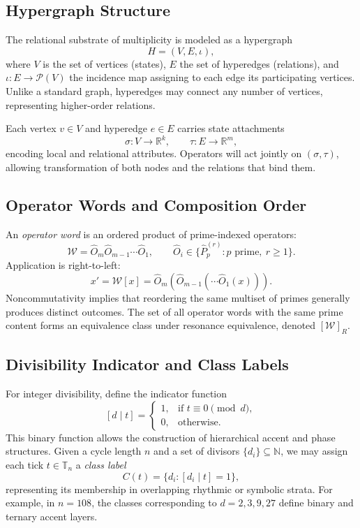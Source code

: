 \documentclass[12pt]{article}
\numberwithin{equation}{section}
\theoremstyle{plain}
\theoremstyle{definition}
\theoremstyle{remark}
\begin{document}
\subsection*{Hypergraph Structure}
The relational substrate of multiplicity is modeled as a hypergraph
\[
H = (V, E, \iota),
\]
where \(V\) is the set of vertices (states), \(E\) the set of hyperedges (relations), and \(\iota:E\to \mathcal{P}(V)\) the incidence map assigning to each edge its participating vertices. Unlike a standard graph, hyperedges may connect any number of vertices, representing higher-order relations.

Each vertex \(v\in V\) and hyperedge \(e\in E\) carries state attachments
\[
\sigma: V \to \mathbb{R}^k, \qquad \tau: E \to \mathbb{R}^m,
\]
encoding local and relational attributes. Operators will act jointly on \((\sigma,\tau)\), allowing transformation of both nodes and the relations that bind them.

\subsection*{Operator Words and Composition Order}
An \emph{operator word} is an ordered product of prime-indexed operators:
\[
\mathcal{W} = \hat{O}_m \hat{O}_{m-1}\cdots \hat{O}_1, \qquad \hat{O}_i \in \{\hat{P}_p^{(r)} : p \text{ prime},\ r\ge 1\}.
\]
Application is right-to-left:
\[
x' = \mathcal{W}[x] = \hat{O}_m(\hat{O}_{m-1}(\cdots \hat{O}_1(x))).
\]
Noncommutativity implies that reordering the same multiset of primes generally produces distinct outcomes. The set of all operator words with the same prime content forms an equivalence class under resonance equivalence, denoted \([\mathcal{W}]_R\).

\subsection*{Divisibility Indicator and Class Labels}
For integer divisibility, define the indicator function
\[
[d\mid t] = 
\begin{cases}
1, & \text{if } t \equiv 0 \pmod d,\\
0, & \text{otherwise}.
\end{cases}
\]
This binary function allows the construction of hierarchical accent and phase structures. Given a cycle length \(n\) and a set of divisors \(\{d_i\}\subseteq \mathbb{N}\), we may assign each tick \(t\in\mathbb{T}_n\) a \emph{class label}
\[
C(t) = \{d_i : [d_i\mid t]=1\},
\]
representing its membership in overlapping rhythmic or symbolic strata. For example, in \(n=108\), the classes corresponding to \(d=2,3,9,27\) define binary and ternary accent layers.
\end{document}
